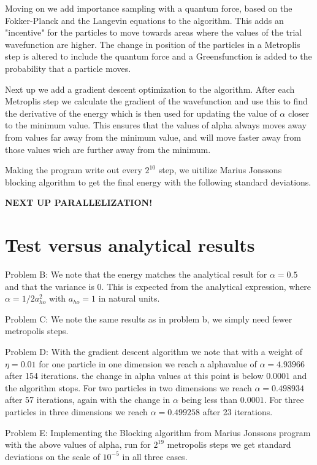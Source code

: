 \documentclass[a4paper, 10pt, english]{revtex4-2} %
\begin{document}
    Moving on we add importance sampling with a quantum force, based on the Fokker-Planck and the Langevin equations to the algorithm.
    This adds an "incentive" for the particles to move towards areas where the values of the trial wavefunction are higher.
    The change in position of the particles in a Metroplis step is altered to include the quantum force and a Greensfunction is added to the probability that a particle moves.

    Next up we add a gradient descent optimization to the algorithm.
    After each Metroplis step we calculate the gradient of the wavefunction and use this to find the derivative of the energy which is then used for updating the value of $\alpha$ closer to the minimum value.
    This ensures that the values of alpha always moves away from values far away from the minimum value, and will move faster away from those values wich are further away from the minimum.

    Making the program write out every $2^{10}$ step, we uitilize Marius Jonssons blocking algorithm to get the final energy with the following standard deviations.

    \textbf{NEXT UP PARALLELIZATION!}

    
\section*{\large Test versus analytical results}
    Problem B: We note that the energy matches the analytical result for $\alpha = 0.5$ and that the variance is 0.
    This is expected from the analytical expression, where $\alpha = 1/2a_{ho}^2$ with $a_{ho} = 1$ in natural units.
    
    Problem C: We note the same results as in problem b, we simply need fewer metropolis steps.

    Problem D: With the gradient descent algorithm we note that with a weight of $\eta = 0.01$ for one particle in one dimension we reach a alphavalue of $\alpha = 4.93966$ after 154 iterations. the change in alpha values at this point is below $0.0001$ and the algorithm stops.
    For two particles in two dimensions we reach $\alpha = 0.498934$ after 57 iterations, again with the change in $\alpha$ being less than $0.0001$.
    For three particles in three dimensions we reach $\alpha = 0.499258$ after 23 iterations.

    Problem E: Implementing the Blocking algorithm from Marius Jonssons program with the above values of alpha, run for $2^{19}$ metropolis steps we get standard deviations on the scale of $10^{-5}$ in all three cases.
\end{document}
